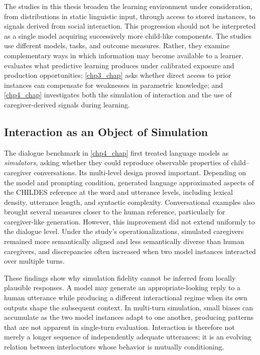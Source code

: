 The studies in this thesis broaden the learning environment under consideration, from distributions in static linguistic input, through access to stored instances, to signals derived from social interaction. This progression should not be interpreted as a single model acquiring successively more child-like components. The studies use different models, tasks, and outcome measures. Rather, they examine complementary ways in which information may become available to a learner.  evaluates what predictive learning produces under calibrated exposure and production opportunities; \cref{chp3_chap} asks whether direct access to prior instances can compensate for weaknesses in parametric knowledge; and \cref{chp4_chap} investigates both the simulation of interaction and the use of caregiver-derived signals during learning.

\subsection{Interaction as an Object of Simulation}

The dialogue benchmark in \cref{chp4_chap} first treated language models as \emph{simulators}, asking whether they could reproduce observable properties of child--caregiver conversations. Its multi-level design proved important. Depending on the model and prompting condition, generated language approximated aspects of the CHILDES reference at the word and utterance levels, including lexical density, utterance length, and syntactic complexity. Conversational examples also brought several measures closer to the human reference, particularly for caregiver-like generation. However, this improvement did not extend uniformly to the dialogue level. Under the study's operationalizations, simulated caregivers remained more semantically aligned and less semantically diverse than human caregivers, and discrepancies often increased when two model instances interacted over multiple turns.

These findings show why simulation fidelity cannot be inferred from locally plausible responses. A model may generate an appropriate-looking reply to a human utterance while producing a different interactional regime when its own outputs shape the subsequent context. In multi-turn simulation, small biases can accumulate as the two model instances adapt to one another, producing patterns that are not apparent in single-turn evaluation. Interaction is therefore not merely a longer sequence of independently adequate utterances; it is an evolving relation between interlocutors whose behavior is mutually conditioning.

